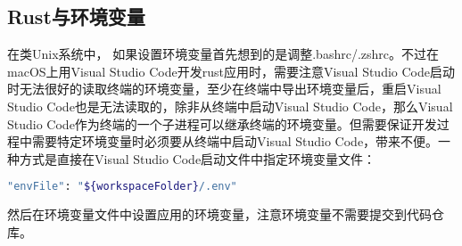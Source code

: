 \documentclass[../../../dolphin-book-2023.tex]{subfiles}
\begin{document}
\subsection{Rust与环境变量}

在类Unix系统中， 如果设置环境变量首先想到的是调整.bashrc/.zshrc。不过在macOS上用Visual Studio Code开发rust应用时，需要注意Visual Studio Code启动时无法很好的读取终端的环境变量，至少在终端中导出环境变量后，重启Visual Studio Code也是无法读取的，除非从终端中启动Visual Studio Code，那么Visual Studio Code作为终端的一个子进程可以继承终端的环境变量。但需要保证开发过程中需要特定环境变量时必须要从终端中启动Visual Studio Code，带来不便。一种方式是直接在Visual Studio Code启动文件中指定环境变量文件：

\begin{lstlisting}[language=Bash]
"envFile": "${workspaceFolder}/.env"
\end{lstlisting}

然后在环境变量文件中设置应用的环境变量，注意环境变量不需要提交到代码仓库。
\end{document}
